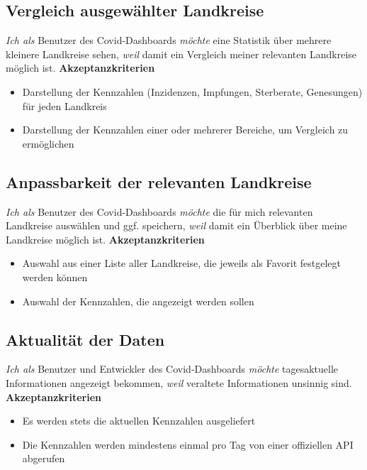 \documentclass[conference]{IEEEtran}
\begin{document}
\subsection{Vergleich ausgewählter Landkreise}
\textit{Ich als} Benutzer des Covid-Dashboards
\textit{möchte} eine Statistik über mehrere kleinere Landkreise sehen,
\textit{weil} damit ein Vergleich meiner relevanten Landkreise möglich ist.
\newline
\textbf{Akzeptanzkriterien}
\begin{itemize}
    \item Darstellung der Kennzahlen (Inzidenzen, Impfungen, Sterberate, Genesungen) für jeden Landkreis
    \item Darstellung der Kennzahlen einer oder mehrerer Bereiche, um Vergleich zu ermöglichen
\end{itemize}

\subsection{Anpassbarkeit der relevanten Landkreise}
\textit{Ich als} Benutzer des Covid-Dashboards
\textit{möchte} die für mich relevanten Landkreise auswählen und ggf. speichern,
\textit{weil} damit ein Überblick über meine Landkreise möglich ist.
\newline
\textbf{Akzeptanzkriterien}
\begin{itemize}
    \item Auswahl aus einer Liste aller Landkreise, die jeweils als Favorit festgelegt werden können
    \item Auswahl der Kennzahlen, die angezeigt werden sollen
\end{itemize}

\newpage
\subsection{Aktualität der Daten}
\textit{Ich als} Benutzer und Entwickler des Covid-Dashboards
\textit{möchte} tagesaktuelle Informationen angezeigt bekommen,
\textit{weil} veraltete Informationen unsinnig sind.
\newline
\textbf{Akzeptanzkriterien}
\begin{itemize}
    \item Es werden stets die aktuellen Kennzahlen ausgeliefert
    \item Die Kennzahlen werden mindestens einmal pro Tag von einer offiziellen API abgerufen
\end{itemize}
\end{document}
